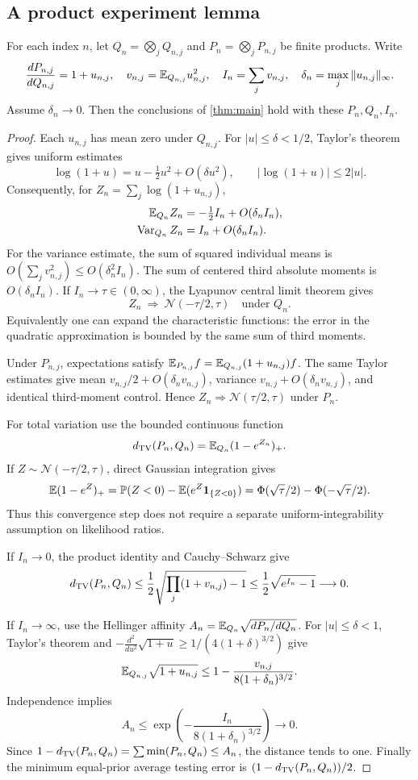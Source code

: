 \subsection{A product experiment lemma}
\begin{lemma}\label{lem:lan}
For each index $n$, let $Q_n=\bigotimes_jQ_{n,j}$ and
$P_n=\bigotimes_jP_{n,j}$ be finite products. Write
\[
\frac{dP_{n,j}}{dQ_{n,j}}=1+u_{n,j},\quad
v_{n,j}=\mathbb E_{Q_{n,j}}u_{n,j}^2,\quad
I_n=\sum_jv_{n,j},\quad
\delta_n=\max_j\|u_{n,j}\|_\infty.
\]
Assume $\delta_n\to0$. Then the conclusions of \cref{thm:main} hold with these
$P_n,Q_n,I_n$.
\end{lemma}
\begin{proof}
Each $u_{n,j}$ has mean zero under $Q_{n,j}$. For $|u|\le\delta<1/2$,
Taylor's theorem gives uniform estimates
\[
\log(1+u)=u-\tfrac12u^2+O(\delta u^2),\qquad
|\log(1+u)|\le2|u|.
\]
Consequently, for $Z_n=\sum_j\log(1+u_{n,j})$,
\begin{align*}
\mathbb E_{Q_n}Z_n&=-\tfrac12 I_n+O(\delta_n I_n),\\
\operatorname{Var}_{Q_n}Z_n&=I_n+O(\delta_n I_n).
\end{align*}
For the variance estimate, the sum of squared individual means is
$O(\sum_jv_{n,j}^2)\le O(\delta_n^2 I_n)$.
The sum of centered third absolute moments is $O(\delta_n I_n)$.
If $I_n\to\tau\in(0,\infty)$, the Lyapunov central limit theorem gives
\[
Z_n\ \Longrightarrow\ \mathcal N(-\tau/2,\tau)
\quad\text{under }Q_n.
\]
Equivalently one can expand the characteristic functions: the error in the
quadratic approximation is bounded by the same sum of third moments.

Under $P_{n,j}$, expectations satisfy
$\mathbb E_{P_{n,j}}f=\mathbb E_{Q_{n,j}}(1+u_{n,j})f$.
The same Taylor estimates give mean $v_{n,j}/2+O(\delta_n v_{n,j})$,
variance $v_{n,j}+O(\delta_n v_{n,j})$, and identical third-moment control.
Hence $Z_n\Longrightarrow\mathcal N(\tau/2,\tau)$ under $P_n$.

For total variation use the bounded continuous function
\[
d_{\mathrm{TV}}(P_n,Q_n)=\mathbb E_{Q_n}(1-e^{Z_n})_+.
\]
If $Z\sim\mathcal N(-\tau/2,\tau)$, direct Gaussian integration gives
\[
\mathbb E(1-e^Z)_+
=\mathbb P(Z<0)-\mathbb E(e^Z\mathbf1_{\{Z<0\}})
=\Phi(\sqrt\tau/2)-\Phi(-\sqrt\tau/2).
\]
Thus this convergence step does not require a separate
uniform-integrability assumption on likelihood ratios.

If $I_n\to0$, the product identity and Cauchy--Schwarz give
\[
d_{\mathrm{TV}}(P_n,Q_n)\le\frac12
\sqrt{\prod_j(1+v_{n,j})-1}
\le\frac12\sqrt{e^{I_n}-1}\longrightarrow0.
\]

If $I_n\to\infty$, use the Hellinger affinity
$A_n=\mathbb E_{Q_n}\sqrt{dP_n/dQ_n}$.
For $|u|\le\delta<1$, Taylor's theorem and
$-\frac{d^2}{du^2}\sqrt{1+u}\ge1/(4(1+\delta)^{3/2})$ give
\[
\mathbb E_{Q_{n,j}}\sqrt{1+u_{n,j}}
\le1-\frac{v_{n,j}}{8(1+\delta_n)^{3/2}}.
\]
Independence implies
\[
A_n\le\exp\left(-\frac{I_n}{8(1+\delta_n)^{3/2}}\right)\longrightarrow0.
\]
Since $1-d_{\mathrm{TV}}(P_n,Q_n)=\sum\min(P_n,Q_n)\le A_n$, the distance tends to one.
Finally the minimum equal-prior average testing error is
$(1-d_{\mathrm{TV}}(P_n,Q_n))/2$.
\end{proof}

